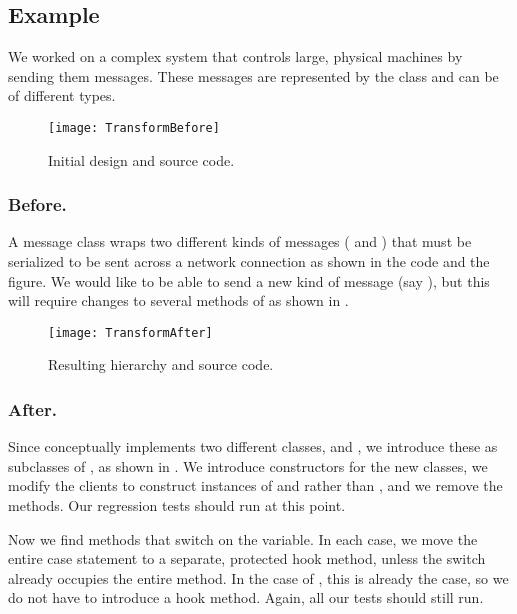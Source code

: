 \documentclass[a4paper,10pt,twoside]{book}
\begin{document}
\subsection*{Example}

We worked on a complex system that controls large, physical machines by sending them messages. These messages are represented by the class  and can be of different types.

\begin{figure}[h]
\begin{center}
\texttt{[image: TransformBefore]}
\caption{Initial design and source code.}
\end{center}
\end{figure}

\subsubsection*{Before.}

A message class wraps two different kinds of messages ( and ) that must be serialized to be sent across a network connection as shown in the code and the figure. We would like to be able to send a new kind of message (say ), but this will require changes to several methods of  as shown in . 

\begin{figure}[htb]
\begin{center}
\texttt{[image: TransformAfter]}
\caption{Resulting hierarchy and source code. }
\end{center}
\end{figure}

\subsubsection*{After.}

Since  conceptually implements two different classes,  and , we introduce these as subclasses of , as shown in . We introduce constructors for the new classes, we modify the clients to construct instances of  and  rather than , and we remove the  methods. Our regression tests should run at this point.

Now we find methods that switch on the  variable. In each case, we move the entire case statement to a separate, protected hook method, unless the switch already occupies the entire method. In the case of , this is already the case, so we do not have to introduce a hook method. Again, all our tests should still run.
\end{document}
